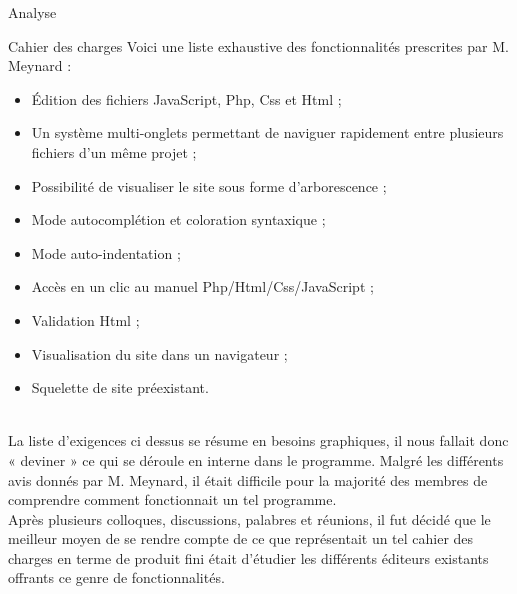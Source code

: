 \documentclass[a4paper, 12pt]{report}
\begin{document}
	\begin{part}{Analyse}
		\begin{chapter}{Cahier des charges}
			Voici une liste exhaustive des fonctionnalités prescrites par M. Meynard :
			\begin{itemize}
				\item Édition des fichiers \gls{JavaScript}, \gls{Php}, \gls{Css} et \gls{Html} ;
				\item Un système multi-onglets permettant de naviguer rapidement entre plusieurs fichiers d'un même projet ;
				\item Possibilité de visualiser le site sous forme d'arborescence ;
				\item Mode \gls{autocomplétion} et coloration syntaxique ;
				\item Mode auto-indentation ;
				\item Accès en un clic au manuel \gls{Php}/\gls{Html}/\gls{Css}/\gls{JavaScript} ;
				\item Validation \gls{Html} ;
				\item Visualisation du site dans un navigateur ;
				\item Squelette de site préexistant.
			\end{itemize}~\\

			La liste d'exigences ci dessus se résume en besoins graphiques, il nous fallait donc « deviner » ce qui se déroule en interne 
			dans le programme. Malgré les différents avis donnés par M. Meynard, il était difficile pour la majorité des membres de
			comprendre comment fonctionnait un tel programme.\\

			Après plusieurs colloques, discussions, palabres et réunions, il fut décidé que le meilleur moyen de se rendre compte de ce que
			représentait un tel cahier des charges en terme de produit fini était d'étudier les différents éditeurs existants offrants ce 
			genre de fonctionnalités.
		\end{chapter}


\end{part}
\end{document}
